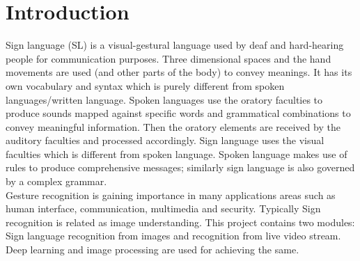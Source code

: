 \chapter{Introduction}
	
\par
Sign language (SL) is a visual-gestural language used by deaf and hard-hearing people for communication purposes. Three dimensional spaces and the hand movements are used (and other parts of the body) to convey meanings. It has its own vocabulary and syntax which is purely different from spoken languages/written language. Spoken languages use the oratory faculties to produce sounds mapped against specific words and
grammatical combinations to convey meaningful information. Then the oratory elements are received by the auditory faculties and processed accordingly. Sign language uses the visual faculties which is different from spoken language. Spoken language makes use of rules to produce comprehensive messages; similarly sign language
is also governed by a complex grammar.\\

Gesture recognition is gaining importance in many applications areas such as human interface, communication, multimedia and security. Typically Sign recognition is related as image understanding. This project contains two modules: Sign language recognition from images and recognition from live video stream. Deep learning and image processing are used for achieving the same. \\


\newpage 

